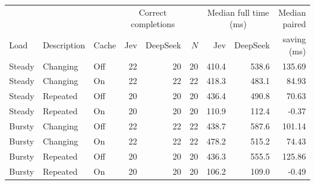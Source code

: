 \begin{tabular}{@{}lllrrrrrr@{}}
\toprule
 & & & \multicolumn{2}{c}{Correct completions} & & \multicolumn{2}{c}{Median full time (ms)} & Median paired \\
\cmidrule(lr){4-5}\cmidrule(lr){7-8}
Load & Description & Cache & Jev & DeepSeek & $N$ & Jev & DeepSeek & saving (ms) \\
\midrule
Steady & Changing & Off & 22 & 20 & 20 & 410.4 & 538.6 & 135.69 \\
Steady & Changing & On & 22 & 22 & 22 & 418.3 & 483.1 & 84.93 \\
Steady & Repeated & Off & 20 & 20 & 20 & 436.4 & 490.8 & 70.63 \\
Steady & Repeated & On & 20 & 20 & 20 & 110.9 & 112.4 & -0.37 \\
Bursty & Changing & Off & 22 & 22 & 22 & 438.7 & 587.6 & 101.14 \\
Bursty & Changing & On & 22 & 22 & 22 & 478.2 & 515.2 & 74.43 \\
Bursty & Repeated & Off & 20 & 20 & 20 & 436.3 & 555.5 & 125.86 \\
Bursty & Repeated & On & 20 & 20 & 20 & 106.2 & 109.0 & -0.49 \\
\bottomrule
\end{tabular}
